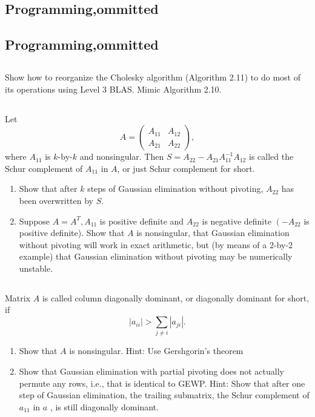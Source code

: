 \documentclass[a4paper]{ctexart}
\newcommand{\pf}{\textbf{\color{pink}{proof:}}}
\begin{document}
\pf

\subsection{Programming,ommitted}
\subsection{Programming,ommitted}
\subsection{}
Show how to reorganize the Cholesky algorithm (Algorithm 2.11) to do most of its operations using Level $3$ BLAS. Mimic Algorithm 2.10.

\pf

\subsection{}
Let
\begin{equation*}
    A = \begin{pmatrix}
        A_{11} & A_{12} \\
        A_{21} & A_{22}
    \end{pmatrix},
\end{equation*}
where $A_{11}$ is $k$-by-$k$ and nonsingular. Then $S=A_{22}-A_{21} A_{11}^{-1} A_{12}$ is called the Schur complement of $A_{11}$ in $A$, or just Schur complement for short.\par
\begin{enumerate}
    \item Show that after $k$ steps of Gaussian elimination without pivoting, $A_{22}$ has been overwritten by $S$.
    \item Suppose $A=A^T, A_{11}$ is positive definite and $A_{22}$ is negative definite $\left(-A_{22}\right.$ is positive definite). Show that $A$ is nonsingular, that Gaussian elimination 
    without pivoting will work in exact arithmetic, but (by means of a 2-by-2 example) 
    that Gaussian elimination without pivoting may be numerically unstable.
\end{enumerate}

\pf

\subsection{}
Matrix $A$ is called column diagonally dominant, or diagonally dominant for short, if
\[\left|a_{i i}\right|>\sum_{j \neq i}\left|a_{j i}\right|.\]
\begin{enumerate}
    \item Show that $A$ is nonsingular. Hint: Use Gershgorin's theorem
    \item Show that Gaussian elimination with partial pivoting does not actually 
    permute any rows, i.e., that is identical to GEWP. Hint: Show that after one 
    step of Gaussian elimination, 
    the trailing submatrix, the Schur complement of $a_{11}$ in $a$ , is still diagonally dominant.
\end{enumerate}
\end{document}
